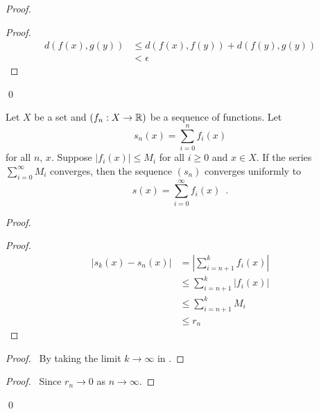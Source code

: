 \begin{proof}
    \pf
    \begin{proof}
        \pf
        \begin{align*}
            d(f(x),g(y)) & \leq d(f(x),f(y)) + d(f(y),g(y)) \\
            & < \epsilon
        \end{align*}
    \end{proof}
    \qed
\end{proof}

\begin{theorem}
    Let $X$ be a set and $(f_n : X \rightarrow \mathbb{R})$ be a sequence of functions. Let
    \[ s_n(x) = \sum_{i=0}^n f_i(x) \]
    for all $n$, $x$. Suppose $|f_i(x)| \leq M_i$ for all $i \geq 0$ and $x \in X$.
    If the series $\sum_{i=0}^\infty M_i$ converges, then the sequence $(s_n)$ converges uniformly to
    \[ s(x) = \sum_{i=0}^\infty f_i(x) \enspace . \]
\end{theorem}

\begin{proof}
    \pf
    \begin{proof}
        \pf
        \begin{align*}
            |s_k(x) - s_n(x)| & = |\sum_{i=n+1}^k f_i(x)| \\
            & \leq \sum_{i=n+1}^k |f_i(x)| \\
            & \leq \sum_{i=n+1}^k M_i \\
            & \leq r_n
        \end{align*}
    \end{proof}
    \begin{proof}
        \pf\ By taking the limit $k \rightarrow \infty$ in .
    \end{proof}
    \qedstep
    \begin{proof}
        \pf\ Since $r_n \rightarrow 0$ as $n \rightarrow \infty$.
    \end{proof}
    \qed
\end{proof}

